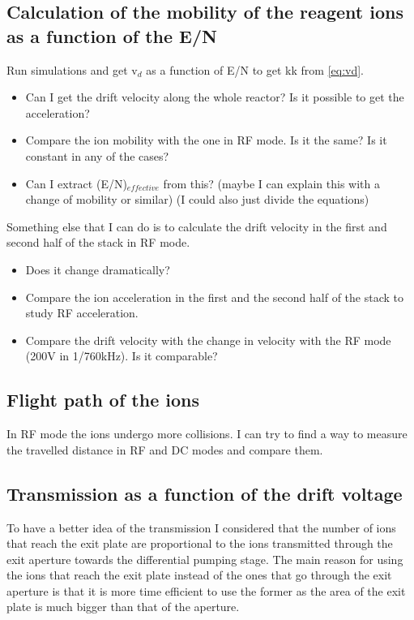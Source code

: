 \subsection{Calculation of the mobility of the reagent ions as a function of the E/N}
Run simulations and get v$_d$ as a function of E/N to get \acrshort{kk} from \ref{eq:vd}.
\begin{itemize}
\item Can I get the drift velocity along the whole reactor? Is it possible to get the acceleration?
\item Compare the ion mobility with the one in RF mode. Is it the same? Is it constant in any of the cases?
\item Can I extract (E/N)$_{effective}$ from this? (maybe I can explain this with a change of mobility or similar) (I could also just divide the equations)
\end{itemize}
 
Something else that I can do is to calculate the drift velocity in the first and second half of the stack in RF mode. 
\begin{itemize}
\item Does it change dramatically?
\item Compare the ion acceleration in the first and the second half of the stack to study RF acceleration.
\item Compare the drift velocity with the change in velocity with the RF mode (200V in 1/760kHz). Is it comparable?
\end{itemize}

\subsection{Flight path of the ions}
In RF mode the ions undergo more collisions. I can try to find a way to measure the travelled distance in RF and DC modes and compare them.




\subsection{Transmission as a function of the drift voltage}









To have a better idea of the transmission I considered that the number of ions that reach the exit plate are proportional to the ions transmitted through the exit aperture towards the differential pumping stage. The main reason for using the ions that reach the exit plate instead of the ones that go through the exit aperture is that it is more time efficient to use the former as the area of the exit plate is much bigger than that of the aperture.

